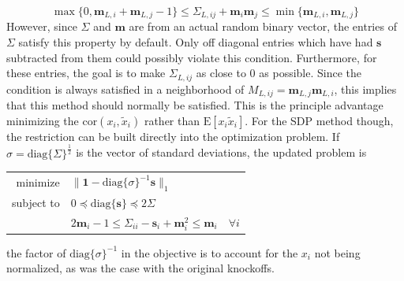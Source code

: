 \documentclass[11pt]{article}
\newcommand{\E}{\mathrm{E}}
\newcommand{\diag}[1]{\mathrm{diag}\{#1\}}
\theoremstyle{definition}
\begin{document}
        \[\max\{0,\mathbf m_{L,i} + \mathbf m_{L,j} -1\} \leq \Sigma_{L,ij} + \mathbf m_i \mathbf m_j \leq \min\{\mathbf m_{L,i}, \mathbf m_{L,j}\} \]
        However, since $\Sigma$ and $\mathbf m$ are from an actual random binary vector, the entries of $\Sigma$ satisfy this property by default. Only off diagonal entries which have had $\mathbf s$ subtracted from them could possibly violate this condition. Furthermore, for these entries, the goal is to make $\Sigma_{L,ij}$ as close to $0$ as possible. Since the condition is always satisfied in a neighborhood of $M_{L,ij} = \mathbf m_{L,j}\mathbf m_{L,i}$, this implies that this method should normally be satisfied. This is the principle advantage minimizing the $\textrm{cor}(x_i,\tilde x_i)$ rather than $\E[x_i\tilde x_i]$. For the SDP method though, the restriction can be built directly into the optimization problem. If $\sigma = \diag{\Sigma}^{\frac{1}{2}}$ is the vector of standard deviations, the updated problem is
            \begin{center}
                \begin{tabular}{r l}
                    minimize & $\|\mathbf 1-\diag{\sigma}^{-1}\mathbf s\|_1$ \\
                    subject to & $ 0 \preceq \diag{\mathbf s} \preceq 2\Sigma $ \\
                               & $ 2\mathbf m_i -1 \leq \Sigma_{ii}-\mathbf s_i + \mathbf m_i^2 \leq \mathbf m_i  \quad \forall i$
                \end{tabular} 
            \end{center} 
            the factor of $\diag{\sigma}^{-1}$ in the objective is to account for the $x_i$ not being normalized, as was the case with the original knockoffs. \par
\end{document}
